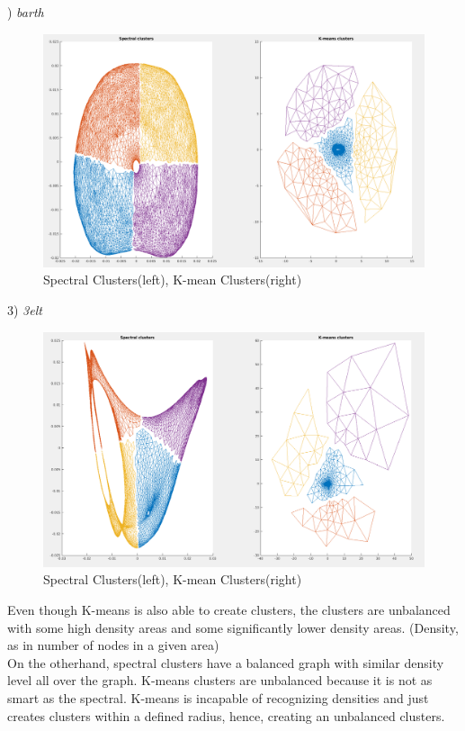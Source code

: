 \documentclass[unicode,11pt,a4paper,oneside,numbers=endperiod,openany]{scrartcl}
\begin{document}
\begin{enumerate}
) \textit{barth}
\begin{figure}[h!]
    \begin{minipage}[c]{1\linewidth}
        \centering
        \includegraphics[width=0.6\linewidth]{./figures/barthCluster.png}
    \end{minipage}
  \caption{Spectral Clusters(left), K-mean Clusters(right)}
\end{figure}

3) \textit{3elt}
\begin{figure}[h!]
    \begin{minipage}[c]{1\linewidth}
        \centering
        \includegraphics[width=0.6\linewidth]{./figures/3eltCluster.png}
    \end{minipage}
  \caption{Spectral Clusters(left), K-mean Clusters(right)}
\end{figure}

Even though K-means is also able to create clusters, the clusters are unbalanced with some high density areas and some significantly lower density areas. (Density, as in number of nodes in a given area) \\

On the otherhand, spectral clusters have a balanced graph with similar density level all over the graph. K-means clusters are unbalanced because it is not as smart as the spectral. K-means is incapable of recognizing densities and just creates clusters within a defined radius, hence, creating an unbalanced clusters. \\


\end{enumerate}
\end{document}
